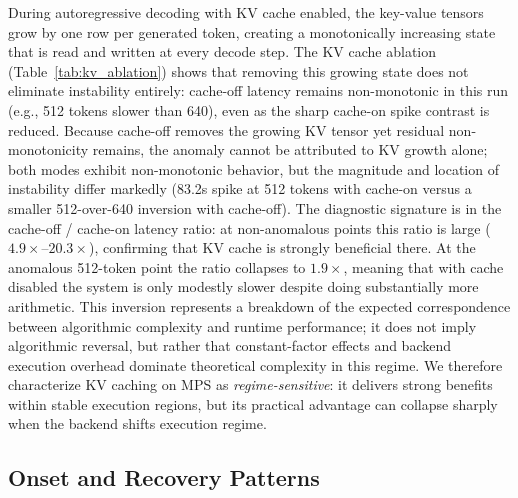 \documentclass{article}
\begin{document}
During autoregressive decoding with KV cache enabled, the key-value tensors grow by one row per generated token, creating a monotonically increasing state that is read and written at every decode step.
The KV cache ablation (Table~\ref{tab:kv_ablation}) shows that removing this growing state does not eliminate instability entirely: cache-off latency remains non-monotonic in this run (e.g., 512 tokens slower than 640), even as the sharp cache-on spike contrast is reduced.
Because cache-off removes the growing KV tensor yet residual non-monotonicity remains, the anomaly cannot be attributed to KV growth alone; both modes exhibit non-monotonic behavior, but the magnitude and location of instability differ markedly (83.2s spike at 512 tokens with cache-on versus a smaller 512-over-640 inversion with cache-off).
The diagnostic signature is in the cache-off / cache-on latency ratio: at non-anomalous points this ratio is large ($4.9\times$--$20.3\times$), confirming that KV cache is strongly beneficial there.
At the anomalous 512-token point the ratio collapses to $1.9\times$, meaning that with cache disabled the system is only modestly slower despite doing substantially more arithmetic.
This inversion represents a breakdown of the expected correspondence between algorithmic complexity and runtime performance; it does not imply algorithmic reversal, but rather that constant-factor effects and backend execution overhead dominate theoretical complexity in this regime. We therefore characterize KV caching on MPS as \emph{regime-sensitive}: it delivers strong benefits within stable execution regions, but its practical advantage can collapse sharply when the backend shifts execution regime.

\subsection{Onset and Recovery Patterns}
\end{document}
